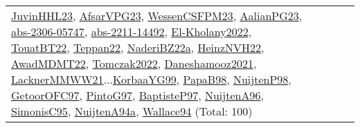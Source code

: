{\begin{longtable}{p{3cm}r>{\raggedright\arraybackslash}p{6cm}>{\raggedright\arraybackslash}p{6cm}>{\raggedright\arraybackslash}p{8cm}}
\hyperref[detail:JuvinHHL23]{JuvinHHL23}, \hyperref[detail:AfsarVPG23]{AfsarVPG23}, \hyperref[detail:WessenCSFPM23]{WessenCSFPM23}, \hyperref[detail:AalianPG23]{AalianPG23}, \hyperref[detail:abs-2306-05747]{abs-2306-05747}, \hyperref[detail:abs-2211-14492]{abs-2211-14492}, \hyperref[detail:El-Kholany2022]{El-Kholany2022}, \hyperref[detail:TouatBT22]{TouatBT22}, \hyperref[detail:Teppan22]{Teppan22}, \hyperref[detail:NaderiBZ22a]{NaderiBZ22a}, \hyperref[detail:HeinzNVH22]{HeinzNVH22}, \hyperref[detail:AwadMDMT22]{AwadMDMT22}, \hyperref[detail:Tomczak2022]{Tomczak2022}, \hyperref[detail:Daneshamooz2021]{Daneshamooz2021}, \hyperref[detail:LacknerMMWW21]{LacknerMMWW21}...\hyperref[detail:KorbaaYG99]{KorbaaYG99}, \hyperref[detail:PapaB98]{PapaB98}, \hyperref[detail:NuijtenP98]{NuijtenP98}, \hyperref[detail:GetoorOFC97]{GetoorOFC97}, \hyperref[detail:PintoG97]{PintoG97}, \hyperref[detail:BaptisteP97]{BaptisteP97}, \hyperref[detail:NuijtenA96]{NuijtenA96}, \hyperref[detail:SimonisC95]{SimonisC95}, \hyperref[detail:NuijtenA94a]{NuijtenA94a}, \hyperref[detail:Wallace94]{Wallace94} (Total: 100)\\

\end{longtable}}
